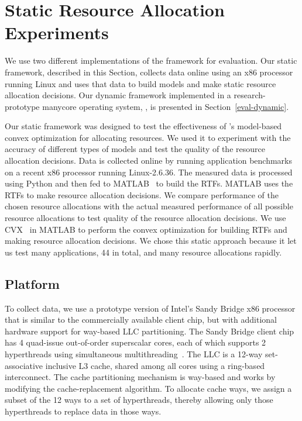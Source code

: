 \section{Static Resource Allocation Experiments}\label{eval-static}


We use two different implementations of the \pacora framework for evaluation. Our static framework, described in this Section, collects data online using an x86 processor running Linux and uses that data to build models and make static resource allocation decisions.  Our dynamic framework implemented in a research-prototype manycore operating system, \tess, is presented in Section~\ref{eval-dynamic}.

Our static framework was designed to test the effectiveness of \pacora's model-based convex optimization for allocating resources.  We used it to experiment with the accuracy of different types of models and test the quality of the resource allocation decisions. Data is collected online by running application benchmarks on a recent x86 processor running Linux-2.6.36.  The measured data is processed using Python and then fed to MATLAB~\cite{matlab} to build the RTFs.  MATLAB uses the RTFs to make resource allocation decisions.  We compare performance of the chosen resource allocations with the actual measured performance of all possible resource allocations to test quality of the resource allocation decisions. We use CVX~\cite{cvx} in MATLAB to perform the convex optimization for building RTFs and making resource allocation decisions.  We chose this static approach because it let us test many applications, 44 in total, and many resource allocations rapidly.

\subsection{Platform}

To collect data, we use a prototype version of Intel's Sandy Bridge x86 processor that is similar to the
commercially available client chip, but with additional hardware
support for way-based LLC partitioning.
The Sandy Bridge client chip has 4 quad-issue out-of-order
superscalar cores, each of which supports 2 hyperthreads using
simultaneous multithreading~\cite{IntelRefManual:2011}.
The LLC is a 12-way
set-associative  inclusive L3 cache, shared among all
cores using a ring-based interconnect.
The cache partitioning mechanism is way-based and works by modifying the
cache-replacement algorithm.  To allocate cache ways, we assign a subset of
the 12 ways to a set of hyperthreads, thereby allowing only those hyperthreads to replace data in those ways.

